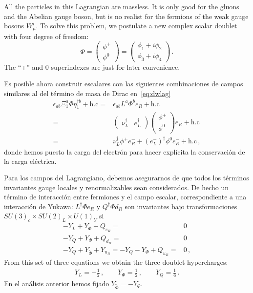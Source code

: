 \begin{frame}
All the particles in this Lagrangian are massless. It is only good for the gluons and the Abelian gauge boson, but is no realist for the fermions of the weak gauge bosons $W_\mu^i$. To solve this problem, we postulate a new complex scalar doublet with four degree of freedom:
\begin{equation}
  \Phi=
  \begin{pmatrix}
    \phi^+\\
    \phi^0
  \end{pmatrix}=
  \begin{pmatrix}
    \phi_1+i\phi_2\\
\phi_3+i\phi_4
  \end{pmatrix}\,.
\end{equation}
The ``+'' and 0 superindexes are just for later convenience.





Es posible ahora construir escalares con las siguientes combinaciones de campos similares al del término de masa de Dirac en~\eqref{eq:dwlag}
\begin{align}
 \epsilon_{ab} \Xi_1^{a}\Phi\eta^{\dagger b}_1+\text{h.c}=&\epsilon_{ab}L^a\Phi^b e_R+\text{h.c} \nonumber\\
   =&\begin{pmatrix}
     \nu_L^{\dagger} & e_L^{\dagger}
   \end{pmatrix}
   \begin{pmatrix}
     \phi^+\\
     \phi^0
   \end{pmatrix}
 e_R +\text{h.c}\nonumber\\
=&\nu_L^{\dagger} \phi^+ e_R^- +\left( e_L^- \right)^{\dagger}\phi^0 e_R^-+\text{h.c}\,,
\end{align}
donde hemos puesto la carga del electrón para hacer explícita la conservación de la carga eléctrica. 


Para los campos del Lagrangiano, debemos asegurarnos de que todos los términos invariantes gauge locales y renormalizables sean considerados. De hecho un término de interacción entre fermiones y el campo escalar, correspondiente a una interacción de Yukawa: $ L^{\dagger}\Phi e_R$ y $ Q^{\dagger}\Phi d_R$ son invariantes bajo transformaciones $SU(3)_c\times  SU(2)_L\times  U(1)_Y$ si
\begin{align*}
  -Y_L+Y_\Phi+Q_{e_R}=&0\\
  -Y_Q+Y_\Phi+Q_{d_R}=&0\\
  -Y_Q+Y_{\widetilde{\Phi}}+Y_{u_R}=-Y_Q-Y_{\Phi}+Q_{u_R}=&0\,,
\end{align*}
From this set of three equations we obtain the three doublet hypercharges:
\begin{align}
\label{eq:lhyp}
Y_L=-\frac{1}{2}\,,\qquad Y_\Phi=\frac{1}{2}\,,\qquad Y_Q=\frac{1}{6}\,.
\end{align}
En el análisis anterior hemos fijado $Y_{\widetilde{\Phi}}=-Y_\Phi$. 


\end{frame}
